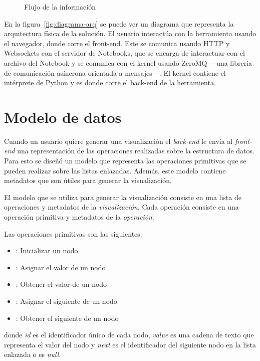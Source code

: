 \begin{figure}[htb]
    \centering
    
    \caption{Flujo de la información}
    \label{fig:flujo-informacion}
\end{figure}

En la figura~\ref{fig:diagrama-arq} se puede ver un diagrama que representa la arquitectura física de la solución. El usuario interactúa con la herramienta usando el navegador, donde corre el front-end. Este se comunica usando HTTP y Websockets con el servidor de Notebooks, que se encarga de interactuar con el archivo del Notebook y se comunica con el kernel usando ZeroMQ ---una librería de comunicación asíncrona orientada a mensajes---. El kernel contiene el intérprete de Python y es donde corre el back-end de la herramienta.

\section{Modelo de datos}
\label{sec:modelo-de-datos}

Cuando un usuario quiere generar una visualización el \textit{back-end} le envía al \textit{front-end} una representación de las operaciones realizadas sobre la estructura de datos. Para esto se diseñó un modelo que representa las operaciones primitivas que se pueden realizar sobre las listas enlazadas. Además, este modelo contiene metadatos que son útiles para generar la visualización.

El modelo que se utiliza para generar la visualización consiste en una lista de operaciones y metadatos de la \textit{visualización}. Cada operación consiste en una operación primitiva y metadatos de la \textit{operación}.

Las operaciones primitivas son las siguientes:
\begin{itemize}
    \item{}: Inicializar un nodo
    \item{}: Asignar el valor de un nodo
    \item{}: Obtener el valor de un nodo
    \item{}: Asignar el siguiente de un nodo
    \item{}: Obtener el siguiente de un nodo
\end{itemize}
donde \textit{id} es el identificador único de cada nodo, \textit{value} es una cadena de texto que representa el valor del nodo y \textit{next} es el identificador del siguiente nodo en la lista enlazada o es \textit{null}.

